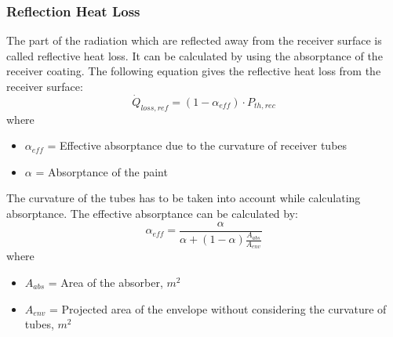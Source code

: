 \subsubsection{Reflection Heat Loss}
The part of the radiation which are reflected away from the receiver surface is called reflective heat loss. It can be calculated by using the absorptance of the receiver coating. The following equation gives the reflective heat loss from the receiver surface:
\begin{equation}
\dot Q_{loss,ref}=(1-\alpha_{eff})\cdot P_{th,rec} 
\end{equation}
where 
\begin{itemize}
	\item $\alpha_{eff}$ = Effective absorptance due to the curvature of receiver tubes
	\item $\alpha$ = Absorptance of the paint
\end{itemize}
The curvature of the tubes has to be taken into account while calculating absorptance. The effective absorptance can be calculated by:
\begin{equation}
\alpha_{eff} = \frac {\alpha} {\alpha+(1-\alpha)\frac{A_{abs}}{A_{env}}}
\end{equation}
where
\begin{itemize}
	\item $A_{abs}$ = Area of the absorber, $m^2$
	\item $A_{env}$ = Projected area of the envelope without considering the curvature of tubes, $m^2$
\end{itemize}
